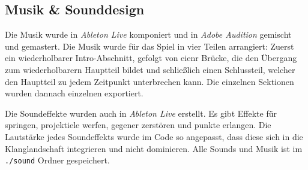 \subsection{Musik \& Sounddesign}

Die Musik wurde in \textit{Ableton Live} komponiert und in \textit{Adobe Audition} gemischt und gemastert.
Die Musik wurde für das Spiel in vier Teilen arrangiert:
Zuerst ein wiederholbarer Intro-Abschnitt, gefolgt von eienr Brücke, die den Übergang zum wiederholbarern Hauptteil bildet und schließlich einen Schlussteil, welcher den Hauptteil zu jedem Zeitpunkt unterbrechen kann.
Die einzelnen Sektionen wurden dannach einzelnen exportiert.

Die Soundeffekte wurden auch in \textit{Ableton Live} erstellt.
Es gibt Effekte für springen, projektiele werfen, gegener zerstören und punkte erlangen.
Die Lautstärke jedes Soundeffekts wurde im Code so angepasst, dass diese sich in die Klanglandschaft integrieren und nicht dominieren.
Alle Sounds und Musik ist im \texttt{./sound} Ordner gespeichert.
